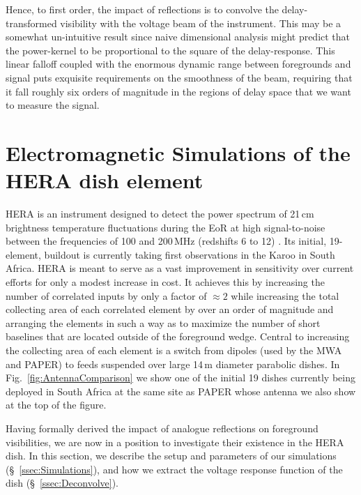 \documentclass[twocolumn]{emulateapj}
\begin{document}
Hence, to first order, the impact of reflections is to convolve the delay-transformed visibility with the voltage beam of the instrument. This may be a somewhat un-intuitive result since naive dimensional analysis might predict that the power-kernel to be proportional to the square of the delay-response. This linear falloff coupled with the enormous dynamic range between foregrounds and signal puts exquisite requirements on the smoothness of the beam, requiring that it fall roughly six orders of magnitude in the regions of delay space that we want to measure the signal.


\section{Electromagnetic Simulations of the HERA dish element}\label{sec:Simulations}

HERA \citep{DeBoer:2016} is an instrument designed to detect the power spectrum of 21\,cm brightness temperature fluctuations during the EoR at high signal-to-noise between the frequencies of 100 and 200\,MHz (redshifts 6 to 12) \citep{Pober:2014}. Its initial, 19-element, buildout is currently taking first observations in the Karoo in South Africa. HERA is meant to serve as a vast improvement in sensitivity over current efforts for only a modest increase in cost. It achieves this by increasing the number of correlated inputs by only a factor of $\approx 2$ while increasing the total collecting area of each correlated element by over an order of magnitude and arranging the elements in such a way as to maximize the number of short baselines that are located outside of the foreground wedge. Central to increasing the collecting area of each element is a switch from dipoles (used by the MWA and PAPER) to feeds suspended over large 14\,m diameter parabolic dishes. In Fig.~\ref{fig:AntennaComparison} we show one of the initial 19 dishes currently being deployed in South Africa at the same site as PAPER whose antenna we also show at the top of the figure. 

Having formally derived the impact of analogue reflections on foreground visibilities, we are now in a position to investigate their existence in the HERA dish. In this section, we describe the setup and parameters of our simulations (\S~\ref{ssec:Simulations}), and how we extract the voltage response function of the dish (\S~\ref{ssec:Deconvolve}).
\end{document}
